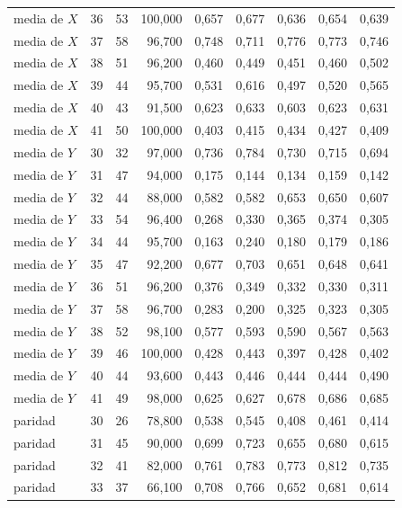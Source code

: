 \begin{table}[htbp]
{\begin{tabular}{@{}lrrrrrrrr@{}}
        media de $X$ & 36 & 53 & 100,000 & 0,657 & 0,677 & 0,636 & 0,654 & 0,639 \\
        media de $X$ & 37 & 58 & 96,700 & 0,748 & 0,711 & 0,776 & 0,773 & 0,746 \\
        media de $X$ & 38 & 51 & 96,200 & 0,460 & 0,449 & 0,451 & 0,460 & 0,502 \\
        media de $X$ & 39 & 44 & 95,700 & 0,531 & 0,616 & 0,497 & 0,520 & 0,565 \\
        media de $X$ & 40 & 43 & 91,500 & 0,623 & 0,633 & 0,603 & 0,623 & 0,631 \\
        media de $X$ & 41 & 50 & 100,000 & 0,403 & 0,415 & 0,434 & 0,427 & 0,409 \\
        media de $Y$ & 30 & 32 & 97,000 & 0,736 & 0,784 & 0,730 & 0,715 & 0,694 \\
        media de $Y$ & 31 & 47 & 94,000 & 0,175 & 0,144 & 0,134 & 0,159 & 0,142 \\
        media de $Y$ & 32 & 44 & 88,000 & 0,582 & 0,582 & 0,653 & 0,650 & 0,607 \\
        media de $Y$ & 33 & 54 & 96,400 & 0,268 & 0,330 & 0,365 & 0,374 & 0,305 \\
        media de $Y$ & 34 & 44 & 95,700 & 0,163 & 0,240 & 0,180 & 0,179 & 0,186 \\
        media de $Y$ & 35 & 47 & 92,200 & 0,677 & 0,703 & 0,651 & 0,648 & 0,641 \\
        media de $Y$ & 36 & 51 & 96,200 & 0,376 & 0,349 & 0,332 & 0,330 & 0,311 \\
        media de $Y$ & 37 & 58 & 96,700 & 0,283 & 0,200 & 0,325 & 0,323 & 0,305 \\
        media de $Y$ & 38 & 52 & 98,100 & 0,577 & 0,593 & 0,590 & 0,567 & 0,563 \\
        media de $Y$ & 39 & 46 & 100,000 & 0,428 & 0,443 & 0,397 & 0,428 & 0,402 \\
        media de $Y$ & 40 & 44 & 93,600 & 0,443 & 0,446 & 0,444 & 0,444 & 0,490 \\
        media de $Y$ & 41 & 49 & 98,000 & 0,625 & 0,627 & 0,678 & 0,686 & 0,685 \\
        paridad & 30 & 26 & 78,800 & 0,538 & 0,545 & 0,408 & 0,461 & 0,414 \\
        paridad & 31 & 45 & 90,000 & 0,699 & 0,723 & 0,655 & 0,680 & 0,615 \\
        paridad & 32 & 41 & 82,000 & 0,761 & 0,783 & 0,773 & 0,812 & 0,735 \\
        paridad & 33 & 37 & 66,100 & 0,708 & 0,766 & 0,652 & 0,681 & 0,614 \\

\end{tabular}}
\end{table}
